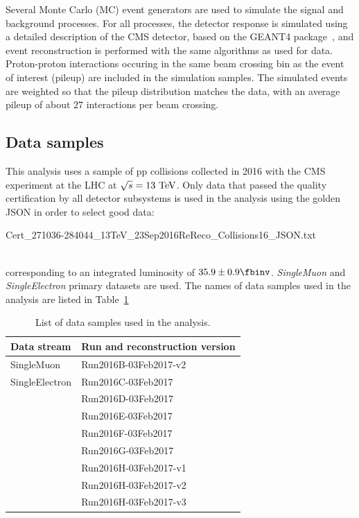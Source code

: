 Several Monte Carlo (MC) event generators are used to simulate the signal and
background processes. For all processes, the detector response is simulated using a detailed description of the CMS detector, based on the \textsc{GEANT4} 
package~\cite{Agostinelli:2002hh}, and event reconstruction is performed with
the same algorithms as used for data. Proton-proton interactions occuring in the same beam crossing bin as the event of interest (pileup) are included in the simulation samples. The simulated events are weighted so that the pileup distribution matches the data, with an average pileup of about $27$ interactions per beam crossing.

\subsection{Data samples}

This analysis uses a sample of pp collisions collected in 2016 with the CMS experiment at the LHC at $\sqrt{s} = 13~\rm{TeV}$.
Only data that passed the quality certification by all detector subsystems is used in the analysis using the golden JSON in order to select good data:
\\
\centerline{\small Cert\_271036-284044\_13TeV\_23Sep2016ReReco\_Collisions16\_JSON.txt}
\\
corresponding to an integrated luminosity of $35.9 \pm 0.9\fbinv$. {\it SingleMuon}  and {\it SingleElectron} primary datasets are used. The names of data samples used in the analysis are listed in Table~\ref{tab:datasample} 

\begin{table}[htbp]
  \caption{List of data samples used in the analysis.\label{tab:datasample}}
  \begin{center}
  \begin{tabular}{l l}
\hline \textbf{Data stream} &  \textbf{Run and reconstruction version}  \\
\hline
SingleMuon      &       Run2016B-03Feb2017-v2   \\
SingleElectron  &       Run2016C-03Feb2017           \\
                &       Run2016D-03Feb2017           \\
		&       Run2016E-03Feb2017   \\
                &       Run2016F-03Feb2017           \\
		&       Run2016G-03Feb2017\\
                &       Run2016H-03Feb2017-v1  \\
		&       Run2016H-03Feb2017-v2 \\
                &       Run2016H-03Feb2017-v3\\
\hline
  \end{tabular}
  \end{center}
\end{table}
 
